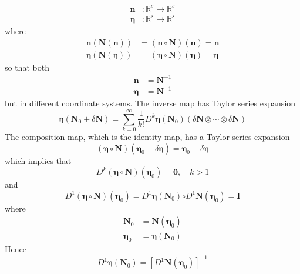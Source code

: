 \documentclass[aps,preprint]{revtex4}%
\begin{document}
\begin{align}
\mathbf{n}  &  :\mathbb{R}^{s}\rightarrow\mathbb{R}^{s}\\
\mathbf{\eta}  &  :\mathbb{R}^{s}\rightarrow\mathbb{R}^{s}%
\end{align}
where
\begin{align}
\mathbf{n}\left(  \mathbf{N}\left(  \mathbf{n}\right)  \right)   &  =\left(
\mathbf{n\circ N}\right)  \left(  \mathbf{n}\right)  =\mathbf{n}\\
\mathbf{\eta}\left(  \mathbf{N}\left(  \mathbf{\eta}\right)  \right)   &
=\left(  \mathbf{\eta\circ N}\right)  \left(  \mathbf{\eta}\right)
=\mathbf{\eta}%
\end{align}
so that both
\begin{align}
\mathbf{n}  &  =\mathbf{N}^{-1}\\
\mathbf{\eta}  &  =\mathbf{N}^{-1}%
\end{align}
but in different coordinate systems. The inverse map has Taylor series
expansion
\begin{equation}
\mathbf{\eta}\left(  \mathbf{N}_{0}+\delta\mathbf{N}\right)  =\sum
_{k=0}^{\infty}\frac{1}{k!}D^{k}\mathbf{\eta}\left(  \mathbf{N}_{0}\right)
\left(  \delta\mathbf{N}\otimes\cdots\otimes\delta\mathbf{N}\right)
\end{equation}
The composition map, which is the identity map, has a Taylor series expansion
\begin{equation}
\left(  \mathbf{\eta\circ N}\right)  \left(  \mathbf{\eta}_{0}+\delta
\mathbf{\eta}\right)  =\mathbf{\eta}_{0}+\delta\mathbf{\eta}%
\end{equation}
which implies that
\begin{equation}
D^{k}\left(  \mathbf{\eta\circ N}\right)  \left(  \mathbf{\eta}_{0}\right)
=\mathbf{0,\quad}k>1
\end{equation}
and
\begin{equation}
D^{1}\left(  \mathbf{\eta\circ N}\right)  \left(  \mathbf{\eta}_{0}\right)
=D^{1}\mathbf{\eta}\left(  \mathbf{N}_{0}\right)  \mathbf{\circ}%
D^{1}\mathbf{N}\left(  \mathbf{\eta}_{0}\right)  =\mathbf{I}%
\end{equation}
where
\begin{align}
\mathbf{N}_{0}  &  =\mathbf{N}\left(  \mathbf{\eta}_{0}\right) \\
\mathbf{\eta}_{0}  &  =\mathbf{\eta}\left(  \mathbf{N}_{0}\right)
\end{align}
Hence%
\begin{equation}
D^{1}\mathbf{\eta}\left(  \mathbf{N}_{0}\right)  =\left[  D^{1}\mathbf{N}%
\left(  \mathbf{\eta}_{0}\right)  \right]  ^{-1}%
\end{equation}
\end{document}

